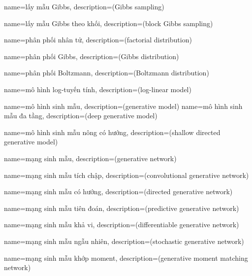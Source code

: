 {
    name={lấy mẫu Gibbs},
    description={(Gibbs sampling)}
}

{
    name={lấy mẫu Gibbs theo khối},
    description={(block Gibbs sampling)}
}

{
    name={phân phối nhân tử},
    description={(factorial distribution)}
}

{
    name={phân phối Gibbs},
    description={(Gibbs distribution)}
}

{
    name={phân phối Boltzmann},
    description={(Boltzmann distribution)}
}

{
    name={mô hình log-tuyến tính},
    description={(log-linear model)}
}

{
    name={mô hình sinh mẫu},
    description={(generative model)}
}
{
    name={mô hình sinh mẫu đa tầng},
    description={(deep generative model)}
}

{
    name={mô hình sinh mẫu nông có hướng},
    description={(shallow directed generative model)}
}

{
    name={mạng sinh mẫu},
    description={(generative network)}
}

{
    name={mạng sinh mẫu tích chập},
    description={(convolutional generative network)}
}

{
    name={mạng sinh mẫu có hướng},
    description={(directed generative network)}
}

{
    name={mạng sinh mẫu tiên đoán},
    description={(predictive generative network)}
}

{
    name={mạng sinh mẫu khả vi},
    description={(diﬀerentiable generative network)}
}

{
    name={mạng sinh mẫu ngẫu nhiên},
    description={(stochastic generative network)}
}


{
    name={mạng sinh mẫu khớp moment},
    description={(generative moment matching network)}
}

